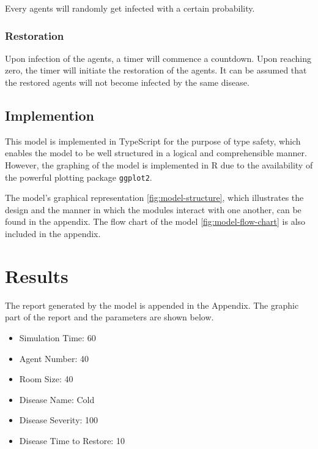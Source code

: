 \documentclass[12pt]{article}
\begin{document}
Every agents will randomly get infected with a certain probability.

\subsubsection{Restoration}

Upon infection of the agents, a timer will commence a countdown. Upon reaching zero, the timer will initiate the restoration of the agents. It can be assumed that the restored agents will not become infected by the same disease.

\subsection{Implemention}

This model is implemented in TypeScript for the purpose of type safety, which enables the model to be well structured in a logical and comprehensible manner. However, the graphing of the model is implemented in R due to the availability of the powerful plotting package  \texttt{ggplot2}.

The model's graphical representation \ref{fig:model-structure}, which illustrates the design and the manner in which the modules interact with one another, can be found in the appendix.
The flow chart of the model \ref{fig:model-flow-chart} is also included in the appendix.

\section{Results}
The report generated by the model is appended in the Appendix. The graphic part of the report and the parameters are shown below.

\begin{itemize}
    \item Simulation Time: 60
    \item Agent Number: 40
    \item Room Size: 40
\end{itemize}


\begin{itemize}
	\item Disease Name: Cold
	\item Disease Severity: 100
	\item Disease Time to Restore: 10
\end{itemize}
\end{document}
